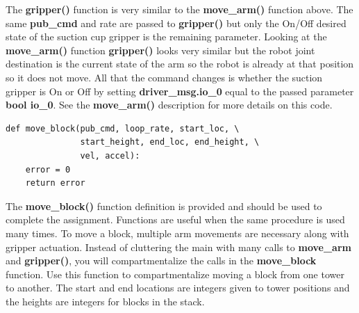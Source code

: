 The \textbf{gripper()} function is very similar to the \textbf{move\_arm()} function above.  The same \textbf{pub\_cmd} and rate are passed to \textbf{gripper()} but only the On/Off
desired state of the suction cup gripper is the remaining parameter.  Looking at the \textbf{move\_arm()} function \textbf{gripper()} looks very similar but the
robot joint destination is the current state of the arm so the robot is already at that position so it does not move.  All that the command
changes is whether the suction gripper is On or Off by setting \textbf{driver\_msg.io\_0} equal to the passed parameter \textbf{bool io\_0}.  See the \textbf{move\_arm()}
description for more details on this code.    


{\footnotesize
\begin{verbatim}
def move_block(pub_cmd, loop_rate, start_loc, \
               start_height, end_loc, end_height, \
               vel, accel):
    error = 0
    return error
\end{verbatim}}

The \textbf{move\_block()} function definition is provided and should be used to complete the assignment. Functions are useful when the same procedure is used many
times.  To move a block, multiple arm movements are necessary along with gripper
actuation. Instead of cluttering the main with many calls to \textbf{move\_arm} and \textbf{gripper()}, you will compartmentalize the calls in the \textbf{move\_block} function.
Use this function to compartmentalize moving a block from one tower to another. 
The start and end locations are integers given to tower positions and the heights are integers for blocks in the stack.



